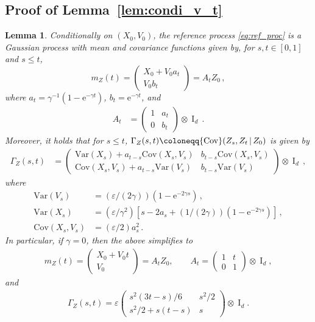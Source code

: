 \documentclass[12pt]{article}
\theoremstyle{plain}
\theoremstyle{plain}
\theoremstyle{remark}
\newcommand{\rme}{\mathrm{e}}
\newcommand*{\defeq}{\coloneqq}
\newcommand{\eps}{\varepsilon}
\newcommand{\ccint}[1]{\left[#1\right]}
\newcommand{\Idd}{\operatorname{I}_d}
\newcommand{\1}{\bm{1}}
\theoremstyle{plain}
\newtheorem{lemma}[theorem]{Lemma}
\theoremstyle{definition}
\theoremstyle{remark}
\begin{document}
\subsection{Proof of Lemma~\ref{lem:condi_v_t}}
\label{sec:proof-lemma-refl}
\begin{lemma}\label{lem:fund}
  Conditionally on $(X_0,V_0)$, the reference process \eqref{eq:ref_proc} is a Gaussian process
  with mean and covariance functions given by, for $s,t \in \ccint{0,1}$ and $s \leq t$,
  \begin{equation*}
    m_Z(t) = \begin{pmatrix}
X_0 + V_0  a_t \\[6pt]
V_0 b_t
\end{pmatrix}  =  A_t Z_0 \,,
    \end{equation*}
where $a_t = \gamma^{-1}(1-\rme^{-\gamma t})$, $b_t = \rme^{-\gamma t}$, and
\begin{align*}
    {A}_t &= \begin{pmatrix}
        1 & a_t \\
        0 & b_t
      \end{pmatrix} \otimes \Idd \,.
\end{align*}
Moreover, it holds that for $s\leq t$, $\Gamma_Z(s,t) \defeq {\rm Cov}(Z_s,Z_t\,|\,Z_0)$ is given by
\begin{align*}
     \Gamma_Z(s,t) &=
     \begin{pmatrix}
\mathrm{Var}(X_s) + a_{t-s}\mathrm{Cov}(X_s,V_s)  & b_{t-s} \mathrm{Cov}(X_s,V_s)  \\
\mathrm{Cov}(X_s,V_s) + a_{t-s}  \mathrm{Var}(V_s)   & b_{t-s}  \mathrm{Var}(V_s)
     \end{pmatrix}
\otimes \Idd \,,
\end{align*}
where
\begin{align*}
    \mathrm{Var}(V_s) &= (\eps /(2 \gamma))( 1  - \rme^{-2 \gamma s} )\,, \\
    \mathrm{Var}(X_s)& =   (\varepsilon/\gamma^2) \left[ s - 2 a_s + (1/(2\gamma))(1-\rme^{-2\gamma s})\right]\,, \\
  \mathrm{Cov}(X_s,V_s) &  =  (\eps/2)a_s^2\,.
\end{align*}
In particular, if $\gamma = 0$, then the above simplifies to
  \begin{align*}
    m_Z(t) = \begin{pmatrix}
        X_0 + V_0 t \\
        V_0
    \end{pmatrix}
    = A_t Z_0, \qquad A_t =
    \begin{pmatrix}
        1 & t \\
        0 & 1
    \end{pmatrix} \otimes \Idd,
\end{align*}
and
\begin{align*}
    \Gamma_Z(s,t) =
\varepsilon     \begin{pmatrix}
  s^2(3t-s)/6 & s^2/2\\
  s^2/2 +s(t-s) & s
    \end{pmatrix}
    \otimes \Idd.
\end{align*}
\end{lemma}
\end{document}
